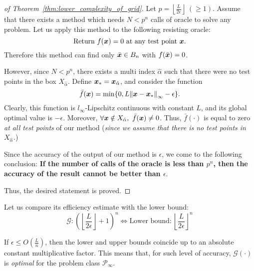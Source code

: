 \begin{proof}[of Theorem~\ref{thm:lower_complexity_of_grid}]
    Let \(p = \left\lfloor \frac{L}{2\epsilon} \right\rfloor~(\ge 1)\). Assume that there exists a method which needs \(N < p^n\) calls of oracle to solve any problem. Let us apply this method to the following resisting oracle:
    \[
        \text{Return} ~ f(\bm{x}) = 0 ~ \text{at any test point} ~  \bm{x}.
    \]
    Therefore this method can find only \(\bar{\bm{x}} \in B_n\) with \(f(\bar{\bm{x}}) = 0\).

    However, since \(N < p^n\), there exists a multi index \(\hat{\alpha}\) such that there were no test points in the box \(X_{\hat{\alpha}}\). Define \(\bm{x}_* = \bm{x}_{\hat{\alpha}}\), and consider the function
    \[
        \bar{f}(\bm{x}) = \min \{ 0, L\norm{\bm{x} - \bm{x}_*}_{\infty} - \epsilon \}.  
    \]
    Clearly, this function is \(l_\infty\)-Lipschitz continuous with constant \(L\), and its global optimal value is \(-\epsilon\).
    Moreover, \(\forall \bm{x} \notin X_{\hat{\alpha}},~\bar{f}(\bm{x}) \ne 0\). Thus, \(\bar{f}(\cdot)\) is equal to zero \emph{at all test points} of our 
    method (\emph{since we assume that there is no test points in \(X_{\hat{\alpha}}\).})

    Since the accuracy of the output of our method is \(\epsilon\), we come to the following conclusion: \textbf{If the number of calls of the oracle is less than \(p^n\), then the accuracy of the result cannot be better than \(\epsilon\)}.

    Thus, the desired statement is proved.
\end{proof}

\begin{thm}\label{thm:upper_lower_bounds}
    Let us compare its efficiency estimate with the lower bound:
    \[
        \mathscr{G}: \left(\left\lfloor \frac{L}{2\epsilon} \right\rfloor + 1\right)^n \Leftrightarrow \text{Lower bound:}~\left\lfloor \frac{L}{2\epsilon} \right\rfloor^n
    \]

    If \(\epsilon \le O\left( \frac{L}{n} \right)\), then the lower and upper bounds coincide up to an absolute constant multiplicative factor. This means that, for such level of accuracy,
    \(\mathscr{G}(\cdot)\) is \emph{optimal} for the problem class \(\mathscr{P}_\infty\).
\end{thm}


